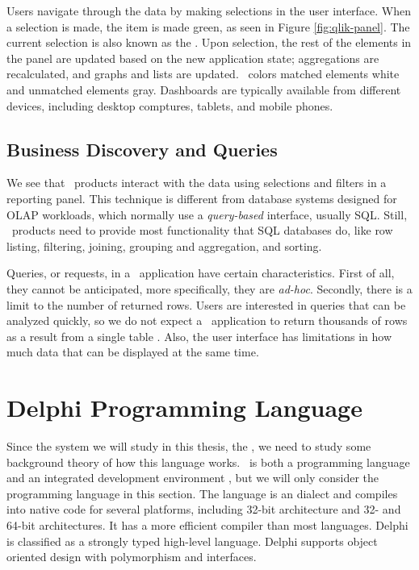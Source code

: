 Users navigate through the data by making selections in the user interface. When a selection is made, the item is made green, as seen in Figure \ref{fig:qlik-panel}. The current selection is also known as the . Upon selection, the rest of the elements in the panel are updated based on the new application state; aggregations are recalculated, and graphs and lists are updated. \qlikview~colors matched elements white and unmatched elements gray. Dashboards are typically available from different devices, including desktop comptures, tablets, and mobile phones.

\subsection{Business Discovery and Queries}
\label{sub:Business Discovery and QueriesL}

We see that \bd~products interact with the data using selections and filters in a reporting panel. This technique is different from database systems designed for OLAP workloads, which normally use a \textit{query-based} interface, usually SQL. Still, \bd~products need to provide most functionality that SQL databases do, like row listing, filtering, joining, grouping and aggregation, and sorting.

Queries, or requests, in a \bd~application have certain characteristics. First of all, they cannot be anticipated, more specifically, they are \textit{ad-hoc}. Secondly, there is a limit to the number of returned rows. Users are interested in queries that can be analyzed quickly, so we do not expect a \bd~application to return thousands of rows as a result from a single table \cite{Ferrari2012-hm}. Also, the user interface has limitations in how much data that can be displayed at the same time. 

\section{Delphi Programming Language}
\label{sec:Delphi Programming Language}
Since the system we will study in this thesis, the \gap, we need to study some background theory of how this language works. \delphi~is both a programming language and an integrated development environment \cite{Wikipedia_contributors2016-jk}, but we will only consider the programming language in this section. The language is an  dialect and compiles into native code for several platforms, including  32-bit architecture and  32- and 64-bit architectures. It has a more efficient compiler than most languages. Delphi is classified as a strongly typed high-level language. Delphi supports object oriented design with polymorphism and interfaces.

